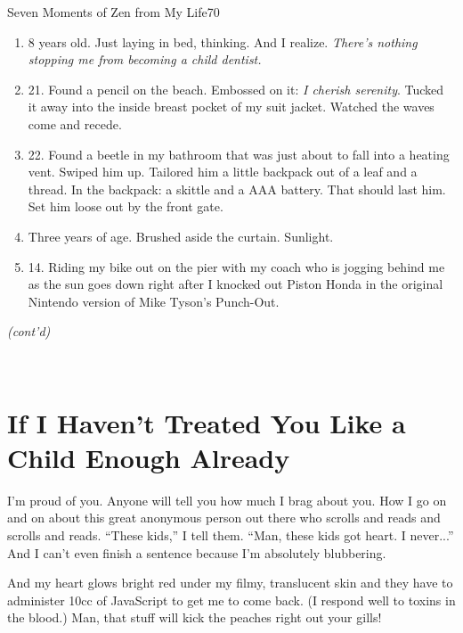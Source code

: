 \documentclass[12pt,twoside]{report}
\begin{document}
	\begin{sidebar}{Seven Moments of Zen from My Life}{70}
		\begin{flushleft}
		\begin{enumerate}
			\item 8 years old. Just laying in bed, thinking. And I realize. \textit{There's nothing stopping me from becoming a child dentist.}
			\item 21. Found a pencil on the beach. Embossed on it: \textit{I cherish serenity}. Tucked it away into the inside breast pocket of my suit jacket. Watched the waves come and recede.
			\item 22. Found a beetle in my bathroom that was just about to fall into a heating vent. Swiped him up. Tailored him a little backpack out of a leaf and a thread. In the backpack: a skittle and a AAA battery. That should last him. Set him loose out by the front gate.
			\item Three years of age. Brushed aside the curtain. Sunlight.
			\item 14. Riding my bike out on the pier with my coach who is jogging behind me as the sun goes down right after I knocked out Piston Honda in the original Nintendo version of Mike Tyson's Punch-Out.
		\end{enumerate}
		\end{flushleft}
		\vspace{6pt}
		\textit{(cont'd)} \vspace{6pt}
	\end{sidebar}


\ %
\vspace*{-50pt}


\section{If I Haven't Treated You Like a Child Enough Already}


I'm proud of you.  Anyone will tell you how much I brag about you.
How I go on and on about this great anonymous person out there who
scrolls and reads and scrolls and reads.  ``These kids,'' I tell them.
``Man, these kids got heart.  I never...''  And I can't even finish a
sentence because I'm absolutely blubbering.

And my heart glows bright red under my filmy, translucent skin and
they have to administer 10cc of JavaScript to get me to come back.  (I
respond well to toxins in the blood.)  Man, that stuff will kick the
peaches right out your gills!
\end{document}
